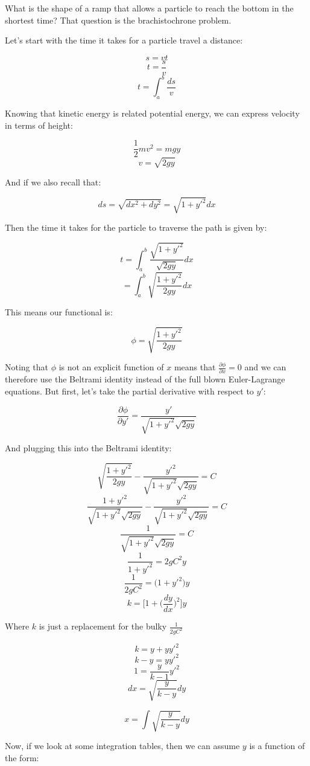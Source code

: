 \documentclass{article}
\begin{document}
What is the shape of a ramp that allows a particle to reach the bottom in the shortest time?  That question is the brachistochrone problem.

Let's start with the time it takes for a particle travel a distance:

$$s = v t$$
$$t = \frac{ s }{ v }$$
$$t = \int_a^b \frac{ ds }{ v }$$

Knowing that kinetic energy is related potential energy, we can express velocity in terms of height:

$$\frac{ 1 }{ 2 }mv^2 = mgy$$
$$v = \sqrt{ 2gy }$$

And if we also recall that:

$$ds = \sqrt{ dx^2 + dy^2 } = \sqrt{ 1 + y'^2 } dx$$

Then the time it takes for the particle to traverse the path is given by:

$$t = \int_a^b \frac{ \sqrt{ 1 + y'^2 } }{ \sqrt{ 2gy } } dx$$
$$ = \int_a^b \sqrt{ \frac{ 1 + y'^2 }{ 2gy } } dx$$

This means our functional is:

$$\phi = \sqrt{ \frac{ 1 + y'^2 }{ 2gy } }$$

Noting that $\phi$ is not an explicit function of $x$ means that $\frac{ \partial \phi }{ \partial x } = 0$ and we can therefore use the Beltrami identity instead of the full blown Euler-Lagrange equations.  But first, let's take the partial derivative with respect to $y'$:

$$\frac{ \partial \phi }{ \partial y' } = \frac{ y' }{ \sqrt{ 1 + y'^2 }\sqrt{ 2gy } }$$

And plugging this into the Beltrami identity:

$$\sqrt{ \frac{ 1 + y'^2 }{ 2gy } } - \frac{ y'^2 }{ \sqrt{ 1 + y'^2 }\sqrt{ 2gy } } = C$$
$$\frac{ 1 + y'^2 }{ \sqrt{ 1 + y'^2 }\sqrt{ 2gy } } - \frac{ y'^2 }{ \sqrt{ 1 + y'^2 }\sqrt{ 2gy } } = C$$
$$\frac{ 1  }{ \sqrt{ 1 + y'^2 }\sqrt{ 2gy } } = C$$
$$\frac{ 1  }{ 1 + y'^2 } = 2gC^2y$$
$$\frac{ 1  }{ 2gC^2 } = \Big( 1 + y'^2 \Big)y$$
$$k = \Big[ 1 + \Big( \frac{ dy }{ dx } \Big)^2 \Big]y$$

Where $k$ is just a replacement for the bulky $\frac{ 1  }{ 2gC^2 }$

$$k = y + yy'^2$$
$$k - y = yy'^2$$
$$1 = \frac{ y }{ k - 1 }y'^2$$
$$dx = \sqrt{ \frac{ y }{ k -y } }dy$$

$$x = \int \sqrt{ \frac{ y }{ k - y } }dy$$

Now, if we look at some integration tables, then we can assume $y$ is a function of the form:
\end{document}
